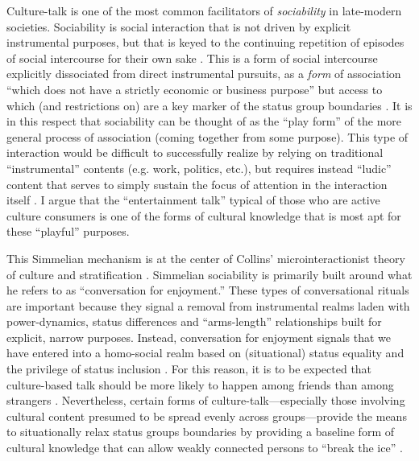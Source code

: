 \documentclass[11pt]{article}
\begin{document}
Culture-talk is one of the most common facilitators of \emph{sociability} in late-modern societies.  Sociability is social interaction that is not driven by explicit instrumental purposes, but that is keyed to the continuing repetition of episodes of social intercourse for their own sake \citep{simmel49}. This is a form of social intercourse explicitly dissociated from direct instrumental pursuits, as a \emph{form} of association ``which does not have a strictly economic or business purpose'' but access to which (and restrictions on) are a key marker of the status group boundaries \citep[114]{weber94}. It is in this respect that sociability can be thought of as the ``play form'' of the more general process of association (coming together from some purpose).  This type of interaction would be difficult to successfully realize by relying on traditional ``instrumental'' contents (e.g. work, politics, etc.), but requires instead ``ludic'' content that serves to simply sustain the focus of attention in the interaction itself \citep{collins04}.  I argue that the ``entertainment talk'' typical of those who are active culture consumers is one of the forms of cultural knowledge that is most apt for these ``playful'' purposes.

This Simmelian mechanism is at the center of Collins' microinteractionist theory of culture and stratification \citep{collins75, collins81, collins00, collins04}.  Simmelian sociability is primarily built around what he refers to as ``conversation for enjoyment.''  These types of conversational rituals are important because they signal a removal from instrumental realms laden with power-dynamics,  status differences and ``arms-length'' relationships built for explicit, narrow purposes.  Instead, conversation for enjoyment signals that we have entered  into a homo-social realm based on (situational) status equality and the privilege of status inclusion \citep{milner04}.  For this reason, it is to be expected  that culture-based talk should be more likely to happen among friends than among strangers \citep[124]{collins75}.  Nevertheless, certain forms of culture-talk---especially those involving cultural content presumed to be spread evenly across groups---provide the means to situationally relax status groups boundaries by providing a baseline form of cultural knowledge that can allow weakly connected persons to ``break the ice'' \citep{erickson96}.  
\end{document}
